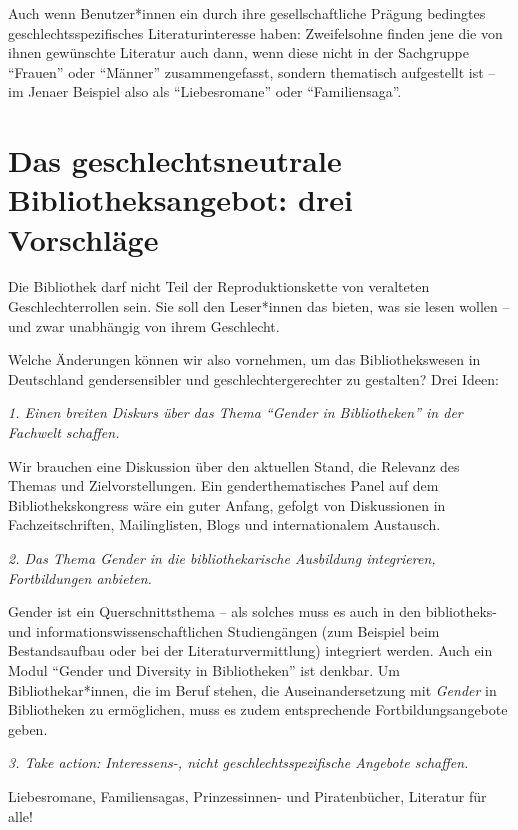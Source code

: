 \documentclass[a4paper,
fontsize=11pt,
oneside,
numbers=noperiodatend,
parskip=half-,
bibliography=totoc,
final
]{scrartcl}
\begin{document}
Auch wenn Benutzer*innen ein durch ihre gesellschaftliche Prägung
bedingtes geschlechtsspezifisches Literaturinteresse haben: Zweifelsohne
finden jene die von ihnen gewünschte Literatur auch dann, wenn diese
nicht in der Sachgruppe \enquote{Frauen} oder \enquote{Männer}
zusammengefasst, sondern thematisch aufgestellt ist -- im Jenaer
Beispiel also als \enquote{Liebesromane} oder \enquote{Familiensaga}.

\section*{Das geschlechtsneutrale Bibliotheksangebot: drei
Vorschläge}\label{das-geschlechtsneutrale-bibliotheksangebot-drei-vorschluxe4ge}

Die Bibliothek darf nicht Teil der Reproduktionskette von veralteten
Geschlechterrollen sein. Sie soll den Leser*innen das bieten, was sie
lesen wollen -- und zwar unabhängig von ihrem Geschlecht.

Welche Änderungen können wir also vornehmen, um das Bibliothekswesen in
Deutschland gendersensibler und geschlechtergerechter zu gestalten? Drei
Ideen:

\emph{1. Einen breiten Diskurs über das Thema \enquote{Gender in
Bibliotheken} in der Fachwelt schaffen.}

Wir brauchen eine Diskussion über den aktuellen Stand, die Relevanz des
Themas und Zielvorstellungen. Ein genderthematisches Panel auf dem
Bibliothekskongress wäre ein guter Anfang, gefolgt von Diskussionen in
Fachzeitschriften, Mailinglisten, Blogs und internationalem Austausch.

\newpage 

\emph{2. Das Thema Gender in die bibliothekarische Ausbildung
integrieren, Fortbildungen anbieten.}

Gender ist ein Querschnittsthema -- als solches muss es auch in den
bibliotheks- und informationswissenschaftlichen Studiengängen (zum
Beispiel beim Bestandsaufbau oder bei der Literaturvermittlung)
integriert werden. Auch ein Modul \enquote{Gender und Diversity in
Bibliotheken} ist denkbar. Um Bibliothekar*innen, die im Beruf stehen,
die Auseinandersetzung mit \emph{Gender} in Bibliotheken zu ermöglichen,
muss es zudem entsprechende Fortbildungsangebote geben.

\emph{3. Take action: Interessens-, nicht geschlechtsspezifische
Angebote schaffen.}

Liebesromane, Familiensagas, Prinzessinnen- und Piratenbücher, Literatur
für alle!
\end{document}
